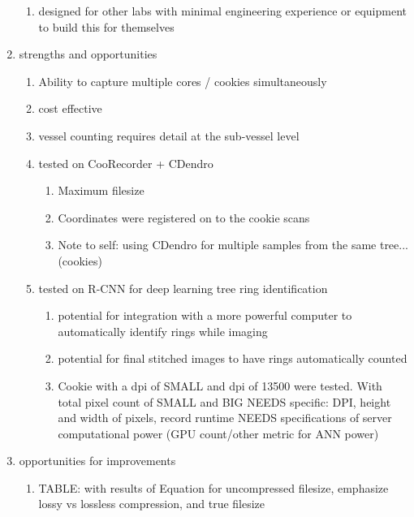 \documentclass{article}
\begin{document}
\begin{outline}[enumerate]
\begin{enumerate}
\begin{enumerate}
		\item designed for other labs with minimal engineering experience or equipment to build this for themselves
		\end{enumerate}
	\item strengths and opportunities
		\begin{enumerate} %
		\item Ability to capture multiple cores / cookies simultaneously
		\item cost effective
		\item vessel counting requires detail at the sub-vessel level %
		\item tested on CooRecorder + CDendro
			\begin{enumerate}
			\item Maximum filesize 
			\item Coordinates were registered on to the cookie scans 
			\item Note to self: using CDendro for multiple samples from the same tree... (cookies) 
			\end{enumerate}
		\item tested on R-CNN for deep learning tree ring identification
			\begin{enumerate}
			\item potential for integration with a more powerful computer to automatically identify rings while imaging
			\item potential for final stitched images to have rings automatically counted
			\item Cookie with a dpi of SMALL and dpi of 13500 were tested. With total pixel count of SMALL and BIG
				\subitem NEEDS specific: DPI, height and width of pixels, record runtime
				\subitem NEEDS specifications of server computational power (GPU count/other metric for ANN power)
			\end{enumerate}
		\end{enumerate}
	\item opportunities for improvements %
		\begin{enumerate}
		\item TABLE: with results of Equation for uncompressed filesize, emphasize lossy vs lossless compression, and true filesize %

\end{enumerate}
\end{enumerate}
\end{outline}
\end{document}
